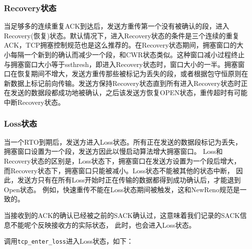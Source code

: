 		\subsubsection{Recovery状态}

			当足够多的连续重复ACK到达后，发送方重传第一个没有被确认的段，进入Recovery(恢复)状态。默认情况下，进入Recovery状态的条件是三个连续的重复ACK，TCP拥塞控制规范也是这么推荐的。在Recovery状态期间，拥塞窗口的大小每隔一个新到的确认而减少一个段，和CWR状态类似。这种窗口减小过程终止与拥塞窗口大小等于ssthresh，即进入Recovery状态时，窗口大小的一半。拥塞窗口在恢复期间不增大，发送方重传那些被标记为丢失的段，或者根据包守恒原则在新数据上标记前向传输。发送方保持Recovery状态直到所有进入Recovery状态时正在发送的数据段都成功地被确认，之后该发送方恢复OPEN状态，重传超时有可能中断Recovery状态。

		\subsubsection{Loss状态}
			当一个RTO到期后，发送方进入Loss状态。所有正在发送的数据段标记为丢失，
			拥塞窗口设置为一个段，发送方因此以慢启动算法增大拥塞窗口。
			Loss和Recovery状态的区别是，Loss状态下，拥塞窗口在发送方设置为一个段后增大，
			而Recovery状态下，拥塞窗口只能被减小。Loss状态不能被其他的状态中断，
			因此，发送方只有在所有Loss开始时正在传输的数据都得到成功确认后，才能退到Open状态。
			例如，快速重传不能在Loss状态期间被触发，这和NewReno规范是一致的。

			当接收到的ACK的确认已经被之前的SACK确认过，这意味着我们记录的SACK信息不能呢个反映接收方的实际状态，
			此时，也会进入Loss状态。

			调用\texttt{tcp_enter_loss}进入Loss状态，如下：

